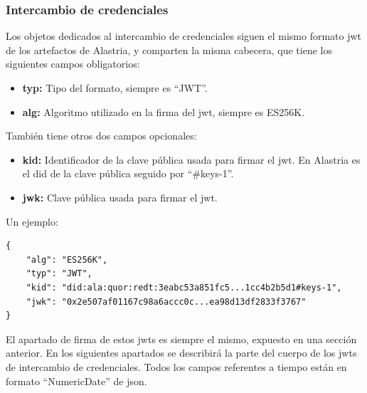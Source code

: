 \subsubsection{Intercambio de credenciales}
Los objetos dedicados al intercambio de credenciales \cite{did-credentials-presentations} siguen el mismo formato \acrshort{jwt} de los artefactos de Alastria, y comparten la misma cabecera, que tiene los siguientes campos obligatorios:
\begin{itemize}
    \item \textbf{typ:} Tipo del formato, siempre es ``JWT''.
    \item \textbf{alg:} Algoritmo utilizado en la firma del \acrshort{jwt}, siempre es ES256K.
\end{itemize}
También tiene otros dos campos opcionales:
\begin{itemize}
    \item \textbf{kid:} Identificador de la clave pública usada para firmar el \acrshort{jwt}. En Alastria es el \acrshort{did} de la clave pública seguido por ``\#keys-1''.
    \item \textbf{jwk:} Clave pública usada para firmar el \acrshort{jwt}.
\end{itemize}
Un ejemplo:
\begin{verbatim}
{
    "alg": "ES256K",
    "typ": "JWT",
    "kid": "did:ala:quor:redt:3eabc53a851fc5...1cc4b2b5d1#keys-1",
    "jwk": "0x2e507af01167c98a6accc0c...ea98d13df2833f3767"
}
\end{verbatim}
El apartado de firma de estos \acrshort{jwt}s es siempre el mismo, expuesto en una sección anterior.
En los siguientes apartados se describirá la parte del cuerpo de los \acrshort{jwt}s de intercambio de credenciales. Todos los campos referentes a tiempo están en formato ``NumericDate'' de \acrshort{json}.
